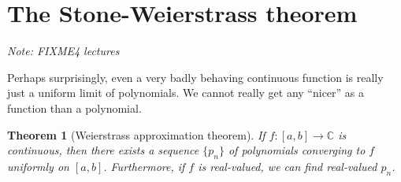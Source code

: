 \documentclass[12pt]{book}
\newcommand{\C}{{\mathbb{C}}}
\newcommand{\sectionnotes}[1]{\noindent \emph{Note: #1} \medskip \par}
\newcommand{\sectionnewpage}{\clearpage}
\theoremstyle{plain}
\newtheorem{thm}{Theorem}[section]
\theoremstyle{remark}
\theoremstyle{definition}
\theoremstyle{exercise}
\theoremstyle{example}
\begin{document}
\medskip


\sectionnewpage
\section{The Stone-Weierstrass theorem}
\label{sec:FIXME}

\sectionnotes{FIXME4 lectures}

\medskip

Perhaps surprisingly, even a very badly behaving continuous function is really
just a uniform limit of polynomials.  We cannot really get any ``nicer'' as
a function than a polynomial.


\begin{thm}[Weierstrass approximation theorem]
If $f \colon [a,b] \to \C$ is continuous, then there exists a sequence $\{
p_n \}$ of polynomials converging to $f$ uniformly on $[a,b]$.
Furthermore, if $f$ is real-valued, we can find real-valued $p_n$.
\end{thm}

\end{document}
